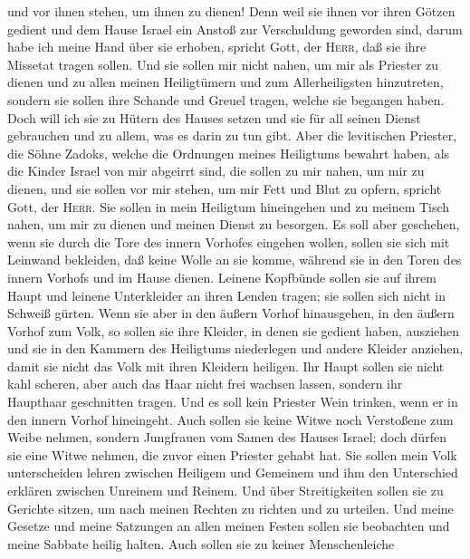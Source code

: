 und vor ihnen stehen, um ihnen zu dienen!  Denn weil sie
ihnen vor ihren Götzen gedient und dem Hause Israel ein Anstoß zur
Verschuldung geworden sind, darum habe ich meine Hand über sie erhoben,
spricht Gott, der \textsc{Herr}, daß sie ihre Missetat tragen sollen.
 Und sie sollen mir nicht nahen, um mir als Priester zu
dienen und zu allen meinen Heiligtümern und zum Allerheiligsten
hinzutreten, sondern sie sollen ihre Schande und Greuel tragen, welche
sie begangen haben.  Doch will ich sie zu Hütern des
Hauses setzen und sie für all seinen Dienst gebrauchen und zu allem, was
es darin zu tun gibt.  Aber die levitischen Priester, die
Söhne Zadoks, welche die Ordnungen meines Heiligtums bewahrt haben, als
die Kinder Israel von mir abgeirrt sind, die sollen zu mir nahen, um mir
zu dienen, und sie sollen vor mir stehen, um mir Fett und Blut zu
opfern, spricht Gott, der \textsc{Herr}.  Sie sollen in
mein Heiligtum hineingehen und zu meinem Tisch nahen, um mir zu dienen
und meinen Dienst zu besorgen.  Es soll aber geschehen,
wenn sie durch die Tore des innern Vorhofes eingehen wollen, sollen sie
sich mit Leinwand bekleiden, daß keine Wolle an sie komme, während sie
in den Toren des innern Vorhofs und im Hause dienen. 
Leinene Kopfbünde sollen sie auf ihrem Haupt und leinene Unterkleider an
ihren Lenden tragen; sie sollen sich nicht in Schweiß gürten.
 Wenn sie aber in den äußern Vorhof hinausgehen, in den
äußern Vorhof zum Volk, so sollen sie ihre Kleider, in denen sie gedient
haben, ausziehen und sie in den Kammern des Heiligtums niederlegen und
andere Kleider anziehen, damit sie nicht das Volk mit ihren Kleidern
heiligen.  Ihr Haupt sollen sie nicht kahl scheren, aber
auch das Haar nicht frei wachsen lassen, sondern ihr Haupthaar
geschnitten tragen.  Und es soll kein Priester Wein
trinken, wenn er in den innern Vorhof hineingeht.  Auch
sollen sie keine Witwe noch Verstoßene zum Weibe nehmen, sondern
Jungfrauen vom Samen des Hauses Israel; doch dürfen sie eine Witwe
nehmen, die zuvor einen Priester gehabt hat.  Sie sollen
mein Volk unterscheiden lehren zwischen Heiligem und Gemeinem und ihm
den Unterschied erklären zwischen Unreinem und Reinem. 
Und über Streitigkeiten sollen sie zu Gerichte sitzen, um nach meinen
Rechten zu richten und zu urteilen. Und meine Gesetze und meine
Satzungen an allen meinen Festen sollen sie beobachten und meine Sabbate
heilig halten.  Auch sollen sie zu keiner Menschenleiche
